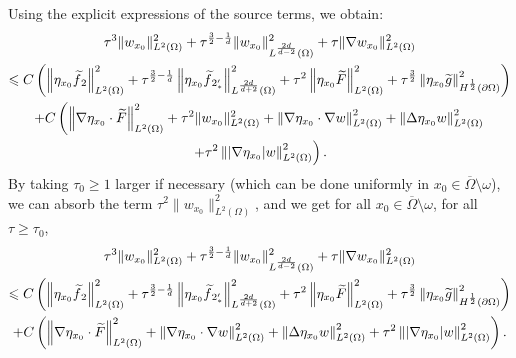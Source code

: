 \documentclass[AHL,Unicode,longabstracts]{cedram}
\newcommand{\norm}[1]{\left\Vert#1\right\Vert}
\renewcommand{\leq}{\leqslant}
\renewcommand{\geq}{\geqslant}
\renewcommand{\tilde}{\widetilde}
\let\oldtilde\tilde
\renewcommand*{\tilde}[1]{\mathchoice{\widetilde{#1}}{\widetilde{#1}}{\oldtilde{#1}}{\oldtilde{#1}}}
\begin{document}
Using the explicit expressions of the source terms, we obtain:
\begin{multline*}
\tau^{3} \| w_{x_0} \|_{L^2(\Omega)}^2 +
\tau^{\frac{3}{2} - \frac{1}{d}} \| w_{x_0} \|_{L^{\frac{2d}{d-2}}(\Omega)}^2 +
\tau \| \nabla w_{x_0} \|_{L^2(\Omega)}^2
\\
\leq C
\left(
\norm{\eta_{x_0} \tilde f_{2}}_{L^2(\Omega)} ^2 +
\tau^{\frac{3}{2}-\frac{1}{d}} \norm{ \eta_{x_0} \tilde f_{2_*'}}_{L^{\frac{2d}{d+2}}(\Omega)}^2 +
\tau^2 \norm{\eta_{x_0} \tilde F}_{L^2(\Omega)}^2 +
\tau^{\frac{3}{2}} \norm{\eta_{x_0} \tilde g}_{H^{\frac{1}{2}}(\partial\Omega)}^2
\right)
\\
+ C
\left(\norm{\nabla \eta_{x_0} \cdot \tilde F }_{L^2(\Omega)}^2 +
\tau^2 \| w_{x_0} \|_{L^2(\Omega)}^2 +
\norm{ \nabla \eta_{x_0} \cdot \nabla w }_{L^2(\Omega)}^2 +
\norm{\Delta \eta_{x_0} w}_{L^2(\Omega)}^2\right.\\ \left. +
\tau^2 \norm{ |\nabla \eta_{x_0}| w }_{L^2(\Omega)}^2
\right).
\end{multline*}
By taking $\tau_0\geq 1$ larger if necessary (which can be done uniformly in $x_0 \in \overline\Omega\setminus\omega$), we can absorb the term $\tau^2 \| w_{x_0} \|_{L^2(\Omega)}^2$, and we get for all $x_0 \in \overline\Omega\setminus\omega$, for all $\tau \geq \tau_0$,
\begin{multline*}
\tau^{3} \| w_{x_0} \|_{L^2(\Omega)}^2 +
\tau^{\frac{3}{2}-\frac{1}{d}} \| w_{x_0} \|_{L^{\frac{2d}{d-2}}(\Omega)}^2 +
\tau \| \nabla w_{x_0} \|_{L^2(\Omega)}^2
\\
\leq C
\left(
\norm{\eta_{x_0} \tilde f_{2}}_{L^2(\Omega)} ^2 +
\tau^{\frac{3}{2}-\frac{1}{d}} \norm{\eta_{x_0} \tilde f_{2_*'}}_{L^{\frac{2d}{d+2}}(\Omega)}^2 +
\tau^2 \norm{\eta_{x_0} \tilde F}_{L^2(\Omega)}^2 +
\tau^{\frac{3}{2}} \norm{\eta_{x_0} \tilde g}_{H^{\frac{1}{2}}(\partial\Omega)}^2
\right)
\\
+ C
\left(\norm{ \nabla \eta_{x_0} \cdot \tilde F }_{L^2(\Omega)}^2 +
\norm{\nabla \eta_{x_0} \cdot \nabla w}_{L^2(\Omega)}^2 +
\norm{\Delta \eta_{x_0} w}_{L^2(\Omega)}^2 +
\tau^2 \norm{ |\nabla \eta_{x_0}| w}_{L^2(\Omega)}^2
\right).
\end{multline*}
\end{document}
